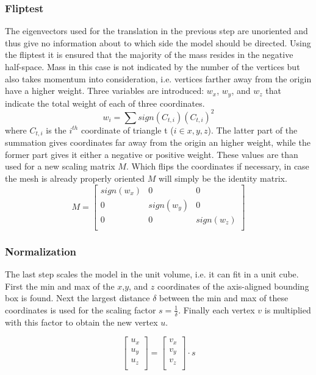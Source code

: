 \documentclass{bigdata}
\begin{document}
\subsubsection{Fliptest}
The eigenvectors used for the translation in the previous step are unoriented and thus give no information about to which side the model should be directed. Using the fliptest it is ensured that the majority of the mass resides in the negative half-space. Mass in this case is not indicated by the number of the vertices but also takes momentum into consideration, i.e. vertices farther away from the origin have a higher weight. Three variables are introduced: $w_x$, $w_y$, and $w_z$ that indicate the total weight of each of three coordinates. 
\begin{equation}
w_i = \sum sign(C_{t,i})(C_{t,i})^2
\end{equation}
 where $C_{t,i}$ is the $i^{th}$ coordinate of triangle t ($i \in {x,y,z}$). The latter part of the summation gives coordinates far away from the origin an higher weight, while the former part gives it either a negative or positive weight. These values are than used for a new scaling matrix $M$. Which flips the coordinates if necessary, in case the mesh is already properly oriented $M$ will simply be the identity matrix.
\[
M = 
\begin{bmatrix}
sign(w_x) & 0 & 0 \\
0 & sign(w_y) & 0 \\
0 & 0 & sign(w_z) \\
\end{bmatrix}
\]

\subsubsection{Normalization}
The last step scales the model in the unit volume, i.e. it can fit in a unit cube. First the min and max of the $x$,$y$, and $z$ coordinates of the axis-aligned bounding box is found. Next the largest distance $\delta$ between the min and max of these coordinates is used for the scaling factor $s = \frac{1}{\delta}$. Finally each vertex $v$ is multiplied with this factor to obtain the new vertex $u$.

\[
\begin{bmatrix}
u_x \\
u_y \\
u_z \\
\end{bmatrix}
=
\begin{bmatrix}
v_x \\
v_y \\
v_z \\
\end{bmatrix}
\cdot s
\]
\end{document}
